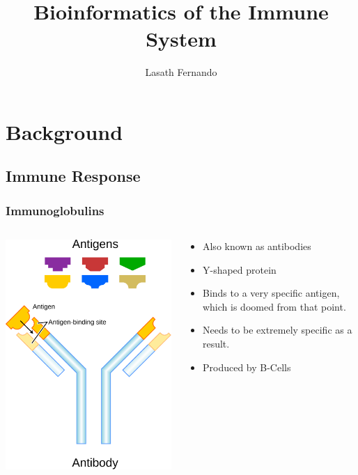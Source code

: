 \documentclass{beamer}
\begin{document}
\title{Bioinformatics of the Immune System}
\author{Lasath Fernando}

\begin{frame}
\titlepage
\end{frame}

\section{Background}
\subsection{Immune Response}
\begin{frame}
  \frametitle{Immunoglobulins}

  \begin{columns}
    \begin{column}{5cm}
    \includegraphics[width=\textwidth]{antibody.pdf}
    \end{column}
    \begin{column}{5cm}
    \begin{itemize}
     \item Also known as antibodies
     \item Y-shaped protein
     \item Binds to a very specific antigen, which is doomed from that point.
     \item Needs to be extremely specific as a result.
     \item Produced by B-Cells
    \end{itemize}


\end{column}
\end{columns}
\end{frame}
\end{document}
